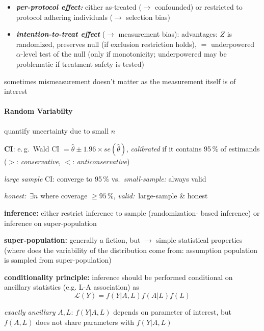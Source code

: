 \documentclass[8pt,twoside]{extarticle}
\begin{document}
\begin{multicols}{2}
\begin{itemize}[itemsep=0em, topsep=0pt, partopsep=0pt,parsep=0pt, leftmargin=1.5em]
\setlength{\itemsep}{0pt}%
\setlength{\parskip}{0pt}
\item \textit{\textbf{per-protocol effect:}} either as-treated ($\to$ confounded) or restricted to protocol adhering individuals ($\to$ selection bias)
\item \textit{\textbf{intention-to-treat effect}} ($\to$ measurement bias): advantages: $Z$ is randomized, preserves null (if exclusion restriction holds), $=$ underpowered $\alpha$-level test of the null (only if monotonicity; underpowered may be problematic if treatment safety is tested)
\end{itemize}


 sometimes mismeasurement doesn't matter as the measurement itself
 is of interest \citep{hernan2023causal}






\paragraph{Random Variabilty}  quantify uncertainty due to small $n$

 \textbf{CI}: e.\,g.\ Wald CI $=\hat{\theta} \pm 1.96 \times se(\hat{\theta})$, \textit{calibrated} if it contains 95\,\% of estimands ($>$: \textit{conservative}, $<$: \textit{anticonservative})

 \textit{large sample} CI: converge to 95\,\% vs.\ \textit{small-sample:} always valid



 \textit{honest:}\ $\exists n$ where coverage $\geq 95\,\%$,
\textit{valid:}\ large-sample \& honest

 \textbf{inference:} either
restrict inference to sample (randomization- based inference) or inference on super-population


 \textbf{super-population:} generally a fiction, but $\to$ simple statistical properties (where does the variability of the distribution come from: 
assumption population is sampled from super-population)

 \textbf{conditionality principle:} inference should be performed conditional on ancillary statistics (e.g. L-A association) as $$\mathcal{L}(Y)=f(Y|A, L)f(A|L)f(L)$$

\textit{exactly ancillary} $A,L$: $f(Y|A, L)$ depends on parameter of interest, but $f(A,L)$ does not share parameters with $f(Y|A, L)$



\end{multicols}
\end{document}
